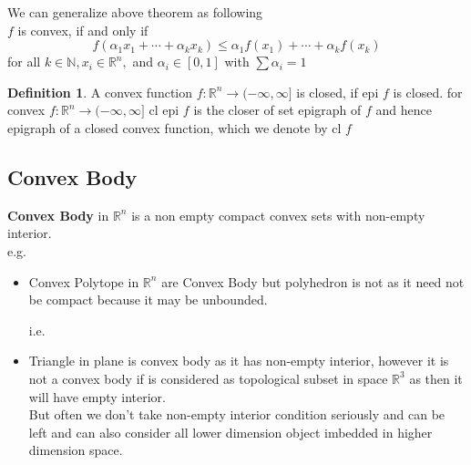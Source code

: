 \documentclass[oneside]{book}
\theoremstyle{definition}
\newtheorem{mydef}{Definition}[chapter]
\begin{document}
We can  generalize above theorem as following \\
$f$ is convex, if and only if
\begin{equation}
\label{eq41}
f\left(\alpha_{1} x_{1}+\cdots+\alpha_{k} x_{k}\right) \leq \alpha_{1} f\left(x_{1}\right)+\cdots+\alpha_{k} f\left(x_{k}\right)
\end{equation}
for all $k \in \mathbb{N}, x_{i} \in \mathbb{R}^{n},$ and $\alpha_{i} \in[0,1]$ with $\sum \alpha_{i}=1$



\begin{mydef}
 A convex function $f: \mathbb{R}^{n} \rightarrow(-\infty, \infty]$ is closed, if epi $f$ is closed.
for convex  $f: \mathbb{R}^{n} \rightarrow(-\infty, \infty]$   cl epi $f$ is the closer of set epigraph of $f$ and hence epigraph of a closed convex function, which we denote by cl $f$
\end{mydef}










\begin{comment}
\begin{mydef}
A function $f: \mathbb{R}^{n} \rightarrow(-\infty, \infty]$ is \textbf{positively homogeneous} of degree 1 if
$$
f(\alpha x)=\alpha f(x), \quad \text { for all } x \in \mathbb{R}^{n}, \alpha \geq 0
$$
$f$ is convex if and only if it is subadditive, given  $f$ is positively homogeneous  as
$$
 f(x+y) \leq f(x)+f(y)  \text{and }f(\alpha x)=\alpha f(x) $$,
  \quad \text { for all } R$ gives definition of convex function
\end{mydef}
\end{comment}
 \subsection{Convex Body}
 
\textbf{Convex Body } in  $\mathbb{R}^n$  is a non empty compact convex sets with non-empty interior.\\
e.g.\\
\begin{itemize}
    \item   Convex Polytope in $\mathbb{R}^n$ are Convex Body but polyhedron is not as it need not be compact because it may be unbounded. 
    
    i.e.\\
    
    \item 
Triangle in plane is convex body as it has non-empty interior, however it is not a convex body if is considered as topological subset in space  $\mathbb{R}^3$ as then it will have  empty interior. 
\\  
But often we don't take non-empty interior condition seriously and can be left and can also consider all lower dimension object imbedded in higher dimension space.
\end{itemize}
 
\end{document}
